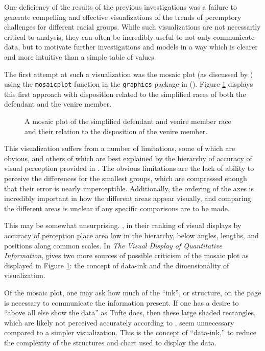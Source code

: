 One deficiency of the results of the previous investigations was a failure to generate compelling and effective visualizations of
the trends of peremptory challenges for different racial groups. While such visualizations are not necessarily critical to
analysis, they can often be incredibly useful to not only communicate data, but to motivate further investigations and models in a
way which is clearer and more intuitive than a simple table of values.

The first attempt at such a visualization was the mosaic plot (as discussed by \cite{friendly1994}) using the \texttt{mosaicplot}
function in the \texttt{graphics} package in \Rp (\cite{Rcite}). Figure \ref{fig:mosaicdefrace} displays this first approach with
disposition related to the simplified races of both the defendant and the venire member.

\begin{figure}[!h]
  \centering
  \caption[Mosaic Plot of Defendant and Venire Member Race]{A mosaic plot of the simplified defendant and venire member race and
    their relation to the disposition of the venire member.}
  \label{fig:mosaicdefrace}
\end{figure}

This visualization suffers from a number of limitations, some of which are obvious, and others of which are best explained by
the hierarchy of accuracy of visual perception provided in \cite{cleveland1987}. The obvious limitations are the lack of ability
to perceive the differences for the smallest groups, which are compressed enough that their error is nearly
imperceptible. Additionally, the ordering of the axes is incredibly important in how the different areas appear visually, and
comparing the different areas is unclear if any specific comparisons are to be made.

This may be somewhat unsurprising. \cite{cleveland1987}, in their ranking of visual displays by accuracy of perception place area
low in the hierarchy, below angles, lengths, and positions along common scales. In \textit{The Visual Display of Quantitative
  Information}, \citeauthor{VisualDisplayQuant} gives two more sources of possible criticism of the mosaic plot as displayed in
Figure \ref{fig:mosaicdefrace}: the concept of data-ink and the dimensionality of visualization.

Of the mosaic plot, one may ask how much of the ``ink'', or structure, on the page is necessary to communicate the information
present. If one has a desire to ``above all else show the data'' as Tufte does, then these large shaded rectangles, which are
likely not perceived accurately according to \citeauthor{cleveland1987}, seem unnecessary compared to a simpler
visualization. This is the concept of ``data-ink,'' to reduce the complexity of the structures and chart used to display the
data.

